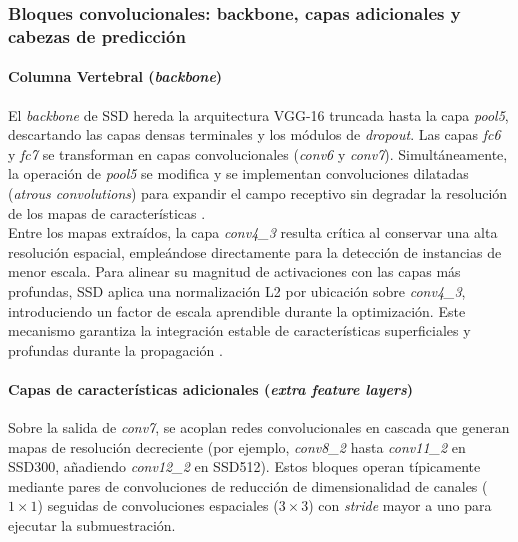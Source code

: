 \subsubsection{Bloques convolucionales: backbone, capas adicionales y cabezas de predicción}

\paragraph{Columna Vertebral (\textit{backbone})}

El \textit{backbone} de SSD hereda la arquitectura VGG-16 truncada hasta la capa \textit{pool5}, descartando las capas densas terminales y los módulos de \textit{dropout}. Las capas \textit{fc6} y \textit{fc7} se transforman en capas convolucionales (\textit{conv6} y \textit{conv7}). Simultáneamente, la operación de \textit{pool5} se modifica y se implementan convoluciones dilatadas (\textit{atrous convolutions}) para expandir el campo receptivo sin degradar la resolución de los mapas de características \cite{liu2016ssd}.\\

Entre los mapas extraídos, la capa \textit{conv4\_3} resulta crítica al conservar una alta resolución espacial, empleándose directamente para la detección de instancias de menor escala. Para alinear su magnitud de activaciones con las capas más profundas, SSD aplica una normalización L2 por ubicación sobre \textit{conv4\_3}, introduciendo un factor de escala aprendible durante la optimización. Este mecanismo garantiza la integración estable de características superficiales y profundas durante la propagación \cite{liu2016ssd}.\\

\paragraph{Capas de características adicionales (\textit{extra feature layers})}

Sobre la salida de \textit{conv7}, se acoplan redes convolucionales en cascada que generan mapas de resolución decreciente (por ejemplo, \textit{conv8\_2} hasta \textit{conv11\_2} en SSD300, añadiendo \textit{conv12\_2} en SSD512). Estos bloques operan típicamente mediante pares de convoluciones de reducción de dimensionalidad de canales ($1\times1$) seguidas de convoluciones espaciales ($3\times3$) con \textit{stride} mayor a uno para ejecutar la submuestración.\\

